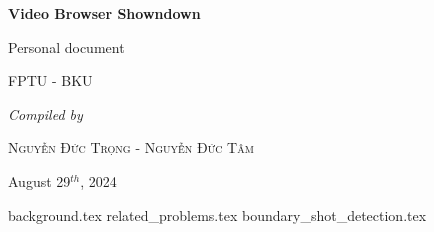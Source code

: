 \documentclass[12pt,a4paper]{article}
\newcommand{\superscript}[1]{$^{{#1}}$}
\newcommand{\titlePage}{
	\begin{titlepage}
		\centering
		
		{\huge \bfseries Video Browser Showndown\par}
		\vspace{.5cm}
		{\Large Personal document\par}
		\vspace{.5cm}
		{\textsc{FPTU - BKU} \par}
		
		\vspace{1cm}
		{\Large\itshape Compiled by\par}
		\vspace{1cm}
		{\textsc{Nguyễn Đức Trọng - Nguyễn Đức Tâm} \par}
		{\large August 29\superscript{th}, 2024\par}
		\begin{center}
			
		\end{center}
	\end{titlepage}
}
\begin{document}
\titlePage\tableofcontents\newpage
{background.tex}
{related_problems.tex}
{boundary_shot_detection.tex} \newpage
\end{document}
